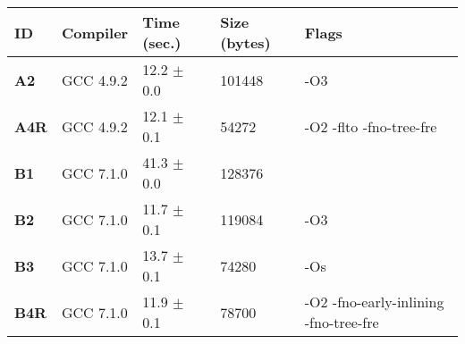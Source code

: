     \begin{tabular}{|l|l|l|l|p{3.2in}|}
     \hline
      \textbf{ID} & \textbf{Compiler} & \textbf{Time (sec.)} & \textbf{Size (bytes)} & \textbf{Flags} \\ 
     \hline
      \textbf{ A2 } &  GCC 4.9.2  &  12.2 $\pm$ 0.0  &  101448  & {\small -O3 }\\
     \hline
      \textbf{ A4R } &  GCC 4.9.2  &  12.1 $\pm$ 0.1  &  54272  & {\small -O2 -flto -fno-tree-fre }\\
     \hline
      \textbf{ B1 } &  GCC 7.1.0  &  41.3 $\pm$ 0.0  &  128376  & {\small  }\\
     \hline
      \textbf{ B2 } &  GCC 7.1.0  &  11.7 $\pm$ 0.1  &  119084  & {\small -O3 }\\
     \hline
      \textbf{ B3 } &  GCC 7.1.0  &  13.7 $\pm$ 0.1  &  74280  & {\small -Os }\\
     \hline
      \textbf{ B4R } &  GCC 7.1.0  &  11.9 $\pm$ 0.1  &  78700  & {\small -O2 -fno-early-inlining -fno-tree-fre }\\
     \hline
    \end{tabular}    